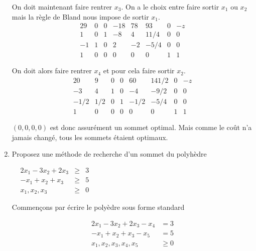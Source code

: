 \begin{enumerate}
\begin{solution}
      On doit maintenant faire rentrer $x_3$.
      On a le choix entre faire sortir $x_1$ ou $x_2$ mais la
      règle de Bland nous impose de sortir $x_1$.
      \[
        \begin{array}{ccccccc|l}
          29 & 0 & 0 & -18 & 78 & 93   & 0 & -z\\
          \hline
           1 & 0 & 1 &  -8 &  4 & 11/4 & 0 & 0\\
          -1 & 1 & 0 &   2 & -2 & -5/4 & 0 & 0\\
           1 & 0 & 0 &   0 &  0 &  0   & 1 & 1
        \end{array}
      \]

      On doit alors faire rentrer $x_4$ et pour cela faire sortir
      $x_2$.
      \[
        \begin{array}{ccccccc|l}
          20   & 9   & 0 & 0 & 60   & 141/2 & 0 & -z\\
          \hline
          -3   & 4   & 1 & 0 & -4   & -9/2  & 0 & 0\\
          -1/2 & 1/2 & 0 & 1 & -1/2 & -5/4  & 0 & 0\\
           1   & 0   & 0 & 0 &  0   &  0    & 1 & 1
        \end{array}
      \]

      $(0,0,0,0)$ est donc assurément un sommet optimal.
      Mais comme le coût n'a jamais changé, tous les sommets
      étaient optimaux.

    \end{solution}

  \item Proposez une méthode de recherche d'un sommet du polyhèdre

    $
    \begin{array}{lrcr}
      & 2x_1-3x_2 +2x_3 & \geq & 3\\
      & -x_1+x_2 +x_3 & \geq & 5\\
      & x_1, x_2, x_3 & \geq & 0
    \end{array}
    $

    \begin{solution}
      Commençons par écrire le polyèdre sous forme standard

      \begin{align*}
        2x_1 - 3x_2 + 2x_3 - x_4 & = 3\\
        -x_1 +  x_2 +  x_3 - x_5 & = 5\\
         x_1, x_2, x_3, x_4, x_5 & \geq 0
      \end{align*}


\end{solution}
\end{enumerate}
